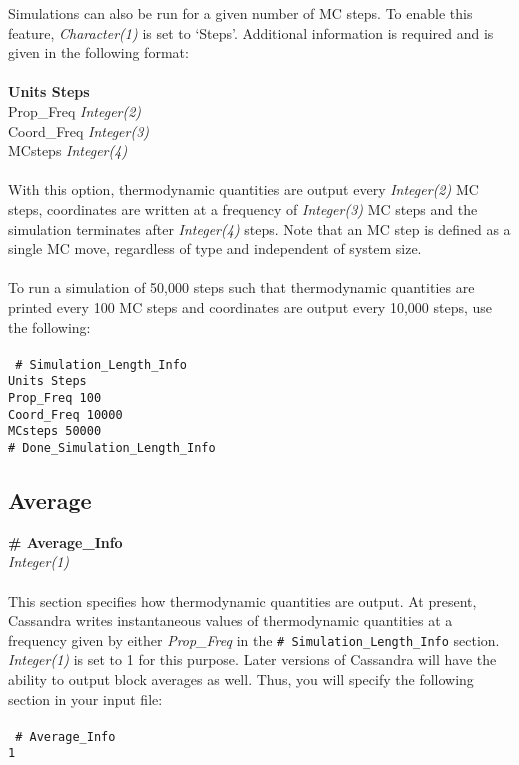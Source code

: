 %
Simulations can also be run for a given number of MC steps. To enable this feature, 
{\it Character(1)} is set to `Steps'. Additional information is required and is given in the
following format: \\ \\
%
{\bf Units    Steps} \\
Prop\_Freq       {\it Integer(2) }\\
Coord\_Freq         {\it Integer(3)} \\
MCsteps                  {\it Integer(4)} \\ \\
%
With this option, thermodynamic quantities are output every {\it Integer(2)} MC steps,
coordinates are written at a frequency of {\it Integer(3)} MC steps and the simulation
terminates after {\it Integer(4)} steps. Note that an MC step is defined as a single MC move, regardless of type and independent of system size.\\ \\
%
To run a simulation of 50,000 steps such that thermodynamic quantities are printed
every 100 MC steps and coordinates are output every 10,000 steps, use the following: \\ \\
%
\texttt{
\# Simulation\_Length\_Info \\
Units           Steps \\
Prop\_Freq      100 \\
Coord\_Freq     10000 \\
MCsteps         50000 \\
\# Done\_Simulation\_Length\_Info}
%
%
%
%
\subsection{Average}\label{sec:Average_Info}
{\bf \# Average\_Info} \\
{\it Integer(1)} \\ \\
%
This section specifies how thermodynamic quantities are output. At present, Cassandra
writes instantaneous values of thermodynamic quantities at a frequency given by
either {\it Prop\_Freq} in the \texttt{\# Simulation\_Length\_Info} section. {\it Integer(1)}
is set to 1 for this purpose. Later versions of Cassandra will have the ability to output block
averages as well. Thus, you will specify the following section in your input file: \\ \\
%
\texttt{
\# Average\_Info \\ 
1}
%
%
